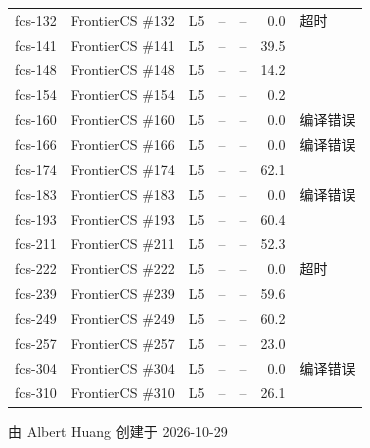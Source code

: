 \documentclass[11pt,a4paper,fontset=none]{ctexart}
\begin{document}
{\begin{longtable}{@{}l>{\raggedright\arraybackslash}p{3.4cm}llrr>{\raggedright\arraybackslash}p{3.1cm}@{}}
fcs-132 & FrontierCS \#132 & L5 & – & – & 0.0 & 超时 \\
fcs-141 & FrontierCS \#141 & L5 & – & – & 39.5 &  \\
fcs-148 & FrontierCS \#148 & L5 & – & – & 14.2 &  \\
fcs-154 & FrontierCS \#154 & L5 & – & – & 0.2 &  \\
fcs-160 & FrontierCS \#160 & L5 & – & – & 0.0 & 编译错误 \\
fcs-166 & FrontierCS \#166 & L5 & – & – & 0.0 & 编译错误 \\
fcs-174 & FrontierCS \#174 & L5 & – & – & 62.1 &  \\
fcs-183 & FrontierCS \#183 & L5 & – & – & 0.0 & 编译错误 \\
fcs-193 & FrontierCS \#193 & L5 & – & – & 60.4 &  \\
fcs-211 & FrontierCS \#211 & L5 & – & – & 52.3 &  \\
fcs-222 & FrontierCS \#222 & L5 & – & – & 0.0 & 超时 \\
fcs-239 & FrontierCS \#239 & L5 & – & – & 59.6 &  \\
fcs-249 & FrontierCS \#249 & L5 & – & – & 60.2 &  \\
fcs-257 & FrontierCS \#257 & L5 & – & – & 23.0 &  \\
fcs-304 & FrontierCS \#304 & L5 & – & – & 0.0 & 编译错误 \\
fcs-310 & FrontierCS \#310 & L5 & – & – & 26.1 &  \\
\bottomrule
\end{longtable}}
\par\vspace{2em}\begin{flushright}由 Albert Huang 创建于 2026-10-29\end{flushright}
\end{document}
